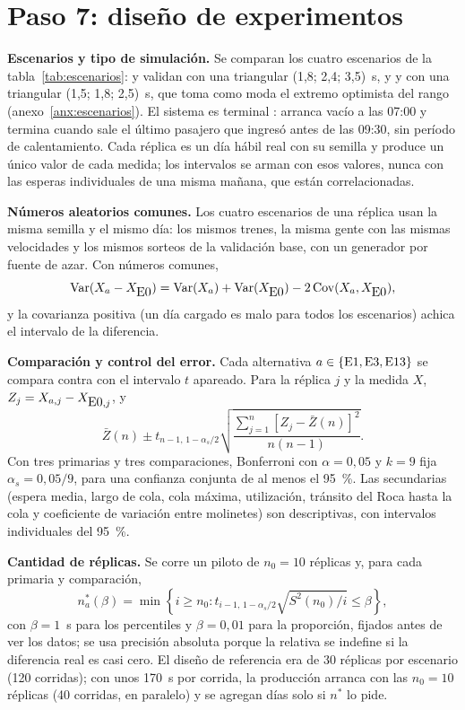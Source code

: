\section{Paso 7: diseño de experimentos}
\label{sec:paso7-diseno-experimentos}

\textbf{Escenarios y tipo de simulación.} Se comparan los cuatro escenarios de la tabla~\ref{tab:escenarios}:
\EO{} y \EI{} validan con una triangular (1,8; 2,4; 3,5)~s, y \ET{} y \EIT{} con una triangular
(1,5; 1,8; 2,5)~s, que toma como moda el extremo optimista del rango \parencite[Exh.~10-27]{tcqsm2013}
(anexo~\ref{anx:escenarios}). El sistema es terminal \parencite{law2015}: arranca vacío a las 07:00 y termina
cuando sale el último pasajero que ingresó antes de las 09:30, sin período de calentamiento. Cada réplica es un
día hábil real con su semilla y produce un único valor de cada medida; los intervalos se arman con esos valores,
nunca con las esperas individuales de una misma mañana, que están correlacionadas.

\textbf{Números aleatorios comunes.} Los cuatro escenarios de una réplica usan la misma semilla y el mismo día:
los mismos trenes, la misma gente con las mismas velocidades y los mismos sorteos de la validación base, con un
generador por fuente de azar. Con números comunes,
\[
\operatorname{Var}(X_{a}-X_{\mbox{E0}{}}) = \operatorname{Var}(X_{a}) + \operatorname{Var}(X_{\mbox{E0}{}})
  - 2\operatorname{Cov}(X_{a}, X_{\mbox{E0}{}}),
\]
y la covarianza positiva (un día cargado es malo para todos los escenarios) achica el intervalo de la
diferencia.

\textbf{Comparación y control del error.} Cada alternativa $a \in \{\mbox{E1}{}, \mbox{E3}{}, \mbox{E13}{}\}$ se compara contra
\EO{} con el intervalo $t$ apareado. Para la réplica $j$ y la medida $X$, $Z_j = X_{a,j} - X_{\mbox{E0}{},j}$, y
\[
\bar Z(n) \pm t_{n-1,\,1-\alpha_s/2}\sqrt{\frac{\sum_{j=1}^{n}\left[Z_j-\bar Z(n)\right]^2}{n(n-1)}} .
\]
Con tres primarias y tres comparaciones, Bonferroni con $\alpha = 0{,}05$ y $k = 9$ fija $\alpha_s = 0{,}05/9$,
para una confianza conjunta de al menos el 95~\%. Las secundarias (espera media, largo de cola, cola máxima, utilización, tránsito del Roca hasta la cola y
coeficiente de variación entre molinetes) son descriptivas, con intervalos individuales del 95~\%.

\textbf{Cantidad de réplicas.} Se corre un piloto de $n_0 = 10$ réplicas y, para cada primaria y comparación,
\[
n^{*}_a(\beta) = \min\left\{ i \ge n_0 : t_{i-1,\,1-\alpha_s/2}\sqrt{S^2(n_0)/i} \le \beta \right\},
\]
con $\beta = 1$~s para los percentiles y $\beta = 0{,}01$ para la proporción, fijados antes de ver los datos; se usa precisión absoluta porque la relativa se indefine si la diferencia
real es casi cero.
El diseño de referencia era de 30 réplicas por escenario (120 corridas); con unos 170~s por corrida, la
producción arranca con las $n_0 = 10$ réplicas (40 corridas, en paralelo) y se agregan días solo si $n^{*}$ lo
pide.

